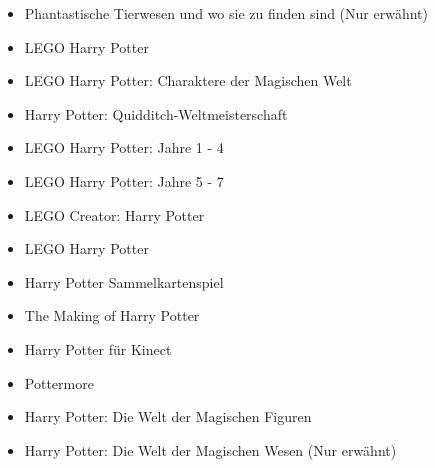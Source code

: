 \documentclass[a4paper, 10pt]{article}
\begin{document}
\begin{itemize}
    \item Phantastische Tierwesen und wo sie zu finden sind (Nur erwähnt)
    \item LEGO Harry Potter
    \item LEGO Harry Potter: Charaktere der Magischen Welt
    \item Harry Potter: Quidditch-Weltmeisterschaft
    \item LEGO Harry Potter: Jahre 1 - 4
    \item LEGO Harry Potter: Jahre 5 - 7
    \item LEGO Creator: Harry Potter
    \item LEGO Harry Potter
    \item Harry Potter Sammelkartenspiel
    \item The Making of Harry Potter
    \item Harry Potter für Kinect
    \item Pottermore
    \item Harry Potter: Die Welt der Magischen Figuren
    \item Harry Potter: Die Welt der Magischen Wesen (Nur erwähnt)
\end{itemize}
\end{document}
